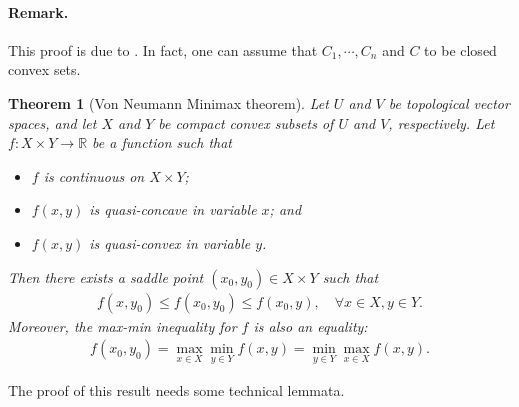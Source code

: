 \documentclass{article}
\numberwithin{equation}{section}
\newcommand{\bbR}{\mathbb{R}}
\newtheorem{theorem}{Theorem}
\begin{document}
\paragraph{Remark.} This proof is due to \cite{Klee}. In fact, one can assume that $C_1,\cdots,C_n$ and $C$ to be closed convex sets. 

\begin{theorem}[Von Neumann Minimax theorem]\label{vonneummanminimax}
Let $U$ and $V$ be topological vector spaces, and let $X$ and $Y$ be compact convex subsets of $U$ and $V$, respectively. Let $f:X\times Y\to\bbR$ be a function such that
\begin{itemize}
\item[(i)] $f$ is continuous on $X\times Y$;
\item[(ii)] $f(x,y)$ is quasi-concave in variable $x$; and
\item[(iii)] $f(x,y)$ is quasi-convex in variable $y$.
\end{itemize}
Then there exists a saddle point $(x_0,y_0)\in X\times Y$ such that
\begin{align*}
	f(x,y_0)\leq f(x_0,y_0)\leq f(x_0,y),\quad\forall x\in X,y\in Y.
\end{align*}
Moreover, the max-min inequality for $f$ is also an equality:
\begin{align*}
	f(x_0,y_0)=\max_{x\in X}\min_{y\in Y}f(x,y)=\min_{y\in Y}\max_{x\in X}f(x,y).
\end{align*}
\end{theorem}

The proof of this result needs some technical lemmata.
\end{document}
